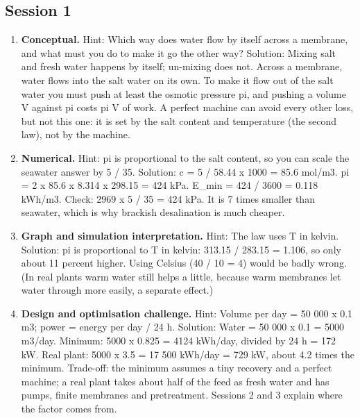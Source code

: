 \documentclass[11pt,a4paper]{article}
\begin{document}
\subsection*{Session 1}
\begin{enumerate}[nosep]
\item \textbf{Conceptual.} Hint: Which way does water flow by itself across a membrane, and what must you do to make it go the other way? Solution: Mixing salt and fresh water happens by itself; un-mixing does not. Across a membrane, water flows into the salt water on its own. To make it flow out of the salt water you must push at least the osmotic pressure pi, and pushing a volume V against pi costs pi V of work. A perfect machine can avoid every other loss, but not this one: it is set by the salt content and temperature (the second law), not by the machine.
\item \textbf{Numerical.} Hint: pi is proportional to the salt content, so you can scale the seawater answer by 5 / 35. Solution: c = 5 / 58.44 x 1000 = 85.6 mol/m3. pi = 2 x 85.6 x 8.314 x 298.15 = 424 kPa. E\_min = 424 / 3600 = 0.118 kWh/m3. Check: 2969 x 5 / 35 = 424 kPa. It is 7 times smaller than seawater, which is why brackish desalination is much cheaper.
\item \textbf{Graph and simulation interpretation.} Hint: The law uses T in kelvin. Solution: pi is proportional to T in kelvin: 313.15 / 283.15 = 1.106, so only about 11 percent higher. Using Celsius (40 / 10 = 4) would be badly wrong. (In real plants warm water still helps a little, because warm membranes let water through more easily, a separate effect.)
\item \textbf{Design and optimisation challenge.} Hint: Volume per day = 50 000 x 0.1 m3; power = energy per day / 24 h. Solution: Water = 50 000 x 0.1 = 5000 m3/day. Minimum: 5000 x 0.825 = 4124 kWh/day, divided by 24 h = 172 kW. Real plant: 5000 x 3.5 = 17 500 kWh/day = 729 kW, about 4.2 times the minimum. Trade-off: the minimum assumes a tiny recovery and a perfect machine; a real plant takes about half of the feed as fresh water and has pumps, finite membranes and pretreatment. Sessions 2 and 3 explain where the factor comes from.
\end{enumerate}
\end{document}
